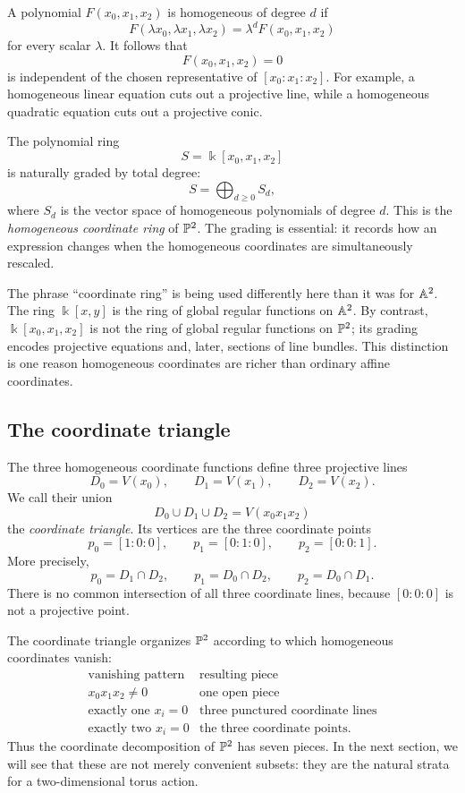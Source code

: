 A polynomial \(F(x_0,x_1,x_2)\) is homogeneous of degree \(d\) if
\[
F(\lambda x_0,\lambda x_1,\lambda x_2)
=
\lambda^dF(x_0,x_1,x_2)
\]
for every scalar \(\lambda\). It follows that
\[
F(x_0,x_1,x_2)=0
\]
is independent of the chosen representative of
\([x_0:x_1:x_2]\). For example, a homogeneous linear equation cuts
out a projective line, while a homogeneous quadratic equation cuts
out a projective conic.

The polynomial ring
\[
S=\Bbbk[x_0,x_1,x_2]
\]
is naturally graded by total degree:
\[
S=\bigoplus_{d\geq0}S_d,
\]
where \(S_d\) is the vector space of homogeneous polynomials of degree
\(d\). This is the \emph{homogeneous coordinate ring} of \(\mathbb{P}^2\).
The grading is essential: it records how an expression changes when
the homogeneous coordinates are simultaneously rescaled.

\begin{observation}
The phrase ``coordinate ring'' is being used differently here than it
was for \(\mathbb{A}^2\). The ring \(\Bbbk[x,y]\) is the ring of global
regular functions on \(\mathbb{A}^2\). By contrast,
\(\Bbbk[x_0,x_1,x_2]\) is not the ring of global regular functions on
\(\mathbb{P}^2\); its grading encodes projective equations and, later,
sections of line bundles. This distinction is one reason homogeneous
coordinates are richer than ordinary affine coordinates.
\end{observation}

\subsection{The coordinate triangle}

The three homogeneous coordinate functions define three projective
lines
\[
D_0=V(x_0),
\qquad
D_1=V(x_1),
\qquad
D_2=V(x_2).
\]
We call their union
\[
D_0\cup D_1\cup D_2
=
V(x_0x_1x_2)
\]
the \emph{coordinate triangle}. Its vertices are the three coordinate
points
\[
p_0=[1:0:0],
\qquad
p_1=[0:1:0],
\qquad
p_2=[0:0:1].
\]
More precisely,
\[
p_0=D_1\cap D_2,
\qquad
p_1=D_0\cap D_2,
\qquad
p_2=D_0\cap D_1.
\]
There is no common intersection of all three coordinate lines, because
\([0:0:0]\) is not a projective point.

The coordinate triangle organizes \(\mathbb{P}^2\) according to which
homogeneous coordinates vanish:
\[
\begin{array}{c|c}
\text{vanishing pattern} & \text{resulting piece}\\
\hline
x_0x_1x_2\neq0
  & \text{one open piece}\\
\text{exactly one }x_i=0
  & \text{three punctured coordinate lines}\\
\text{exactly two }x_i=0
  & \text{the three coordinate points}.
\end{array}
\]
Thus the coordinate decomposition of \(\mathbb{P}^2\) has seven pieces. In
the next section, we will see that these are not merely convenient
subsets: they are the natural strata for a two-dimensional torus
action.

